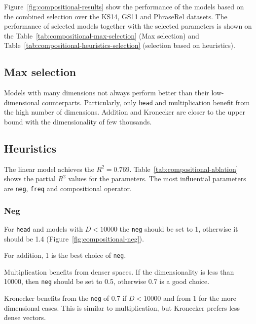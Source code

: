 

Figure~\ref{fig:compositional-results} show the performance of the models based on the combined selection over the KS14, GS11 and PhraseRel datasets. The performance of selected models together with the selected parameters is shown on the Table~\ref{tab:compositional-max-selection} (Max selection) and Table~\ref{tab:compositional-heuristics-selection} (selection based on heuristics).

\subsection{Max selection}
\label{sec:max-selection-compositional}

Models with many dimensions not always perform better than their low-dimensional counterparts. Particularly, only \texttt{head} and multiplication benefit from the high number of dimensions. Addition and Kronecker are closer to the upper bound with the dimensionality of few thousands.

\subsection{Heuristics}
\label{sec:heuristics-compositional}


The linear model achieves the $R^2 = 0.769$. Table~\ref{tab:compositional-ablation} shows the partial $R^2$ values for the parameters. The most influential parameters are \texttt{neg}, \texttt{freq} and compositional operator.

\subsubsection{Neg}
\label{sec:neg-compositional}



For \texttt{head} and models with $D < 10000$ the \texttt{neg} should be set to 1, otherwise it should be 1.4 (Figure~\ref{fig:compositional-neg}).

For addition, 1 is the best choice of \texttt{neg}.

Multiplication benefits from denser spaces. If the dimensionality is less than 10000, then \texttt{neg} should be set to 0.5, otherwise 0.7 is a good choice.

Kronecker benefits from the \texttt{neg} of 0.7 if $D < 10000$ and from 1 for the more dimensional cases. This is similar to multiplication, but Kronecker prefers less dense vectors.

